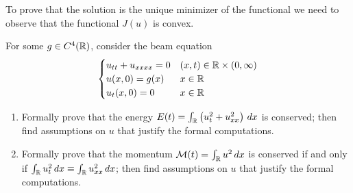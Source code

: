 To prove that the solution is the unique minimizer of the functional we need to
observe that the functional \(J(u)\) is convex.

\newpage
\begin{exercise}
    For some \(g \in C^4(\mathbb{R})\), consider the beam equation
    \[
        \begin{cases}
            u_{tt} + u_{xxxx} = 0 & (x, t) \in \mathbb{R} \times (0, \infty) \\
            u(x, 0) = g(x)        & x \in \mathbb{R}                         \\
            u_t(x, 0) = 0         & x \in \mathbb{R}
        \end{cases}
    \]
    \begin{enumerate}
        \item Formally prove that the energy \(E(t) = \int_{\mathbb{R}} \left( u_t^2 + u_{xx}^2
              \right) \, dx\) is conserved; then find assumptions on \(u\) that justify the
              formal computations.
        \item Formally prove that the momentum \(\mathcal{M}(t) = \int_{\mathbb{R}} u^2 \, dx\) is
              conserved if and only if \(\int_{\mathbb{R}} u_{t}^2 \, dx \equiv \int_{\mathbb{R}} u_{xx}^2
              \, dx\); then find assumptions on \(u\) that justify the formal computations.
    \end{enumerate}
\end{exercise}

